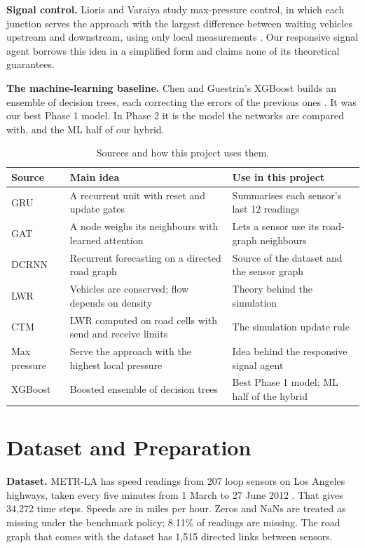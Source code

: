 \documentclass[conference]{IEEEtran}
\begin{document}
\textbf{Signal control.} Lioris and Varaiya study max-pressure control, in which each junction serves the approach with the largest difference between waiting vehicles upstream and downstream, using only local measurements \cite{lioris}. Our responsive signal agent borrows this idea in a simplified form and claims none of its theoretical guarantees.

\textbf{The machine-learning baseline.} Chen and Guestrin's XGBoost builds an ensemble of decision trees, each correcting the errors of the previous ones \cite{xgb}. It was our best Phase 1 model. In Phase 2 it is the model the networks are compared with, and the ML half of our hybrid.

\begin{table}[t]\centering\small
\caption{Sources and how this project uses them.}\label{tab:lit}
\begin{tabular}{@{}p{}p{}p{}@{}}\toprule
Source & Main idea & Use in this project\\\midrule
GRU \cite{cho} & A recurrent unit with reset and update gates & Summarises each sensor's last 12 readings\\
GAT \cite{gat} & A node weighs its neighbours with learned attention & Lets a sensor use its road-graph neighbours\\
DCRNN \cite{dcrnn} & Recurrent forecasting on a directed road graph & Source of the dataset and the sensor graph\\
LWR \cite{lw,richards} & Vehicles are conserved; flow depends on density & Theory behind the simulation\\
CTM \cite{ctm,ctmoverview} & LWR computed on road cells with send and receive limits & The simulation update rule\\
Max pressure \cite{lioris} & Serve the approach with the highest local pressure & Idea behind the responsive signal agent\\
XGBoost \cite{xgb} & Boosted ensemble of decision trees & Best Phase 1 model; ML half of the hybrid\\
\bottomrule\end{tabular}
\end{table}

\section{Dataset and Preparation}
\textbf{Dataset.} METR-LA has speed readings from 207 loop sensors on Los Angeles highways, taken every five minutes from 1 March to 27 June 2012 \cite{dcrnn}. That gives 34,272 time steps. Speeds are in miles per hour. Zeros and NaNs are treated as missing under the benchmark policy; 8.11\% of readings are missing. The road graph that comes with the dataset has 1,515 directed links between sensors.
\end{document}
